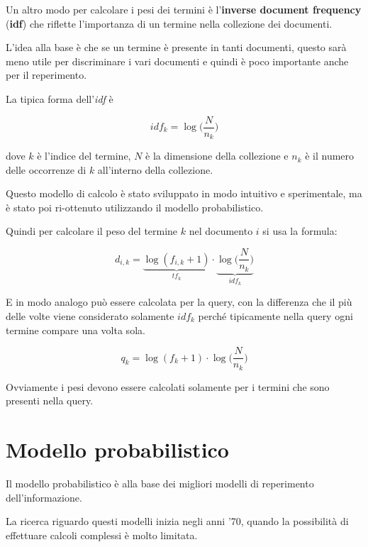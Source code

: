 

Un altro modo per calcolare i pesi dei termini è l'\textbf{inverse document frequency} (\textbf{idf}) che riflette l'importanza di un termine nella collezione dei documenti.

L'idea alla base è che se un termine è presente in tanti documenti, questo sarà meno utile per discriminare i vari documenti e quindi è poco importante anche per il reperimento.

La tipica forma dell'\textit{idf} è

$$
idf_k = \log\bigg(\frac{N}{n_k}\bigg)
$$

\noindent dove $k$ è l'indice del termine, $N$ è la dimensione della collezione e $n_k$ è il numero delle occorrenze di $k$ all'interno della collezione.

Questo modello di calcolo è stato sviluppato in modo intuitivo e sperimentale, ma è stato poi ri-ottenuto utilizzando il modello probabilistico.

Quindi per calcolare il peso del termine $k$ nel documento $i$ si usa la formula:

$$
d_{i,k} = \underbrace{\log (f_{i,k} +1 )}_{tf_k} \cdot \underbrace{\log\bigg(\frac{N}{n_k}\bigg)}_{idf_k}
$$

\noindent E in modo analogo può essere calcolata per la query, con la differenza che il più delle volte viene considerato solamente $idf_k$ perché tipicamente nella query ogni termine compare una volta sola.

$$
q_k = \log(f_k +1 )\cdot \log \bigg(\frac{N}{n_k}\bigg)
$$

\noindent Ovviamente i pesi devono essere calcolati solamente per i termini che sono presenti nella query.

\section{Modello probabilistico}

Il modello probabilistico è alla base dei migliori modelli di reperimento dell'informazione.

La ricerca riguardo questi modelli inizia negli anni '70, quando la possibilità di effettuare calcoli complessi è molto limitata.

